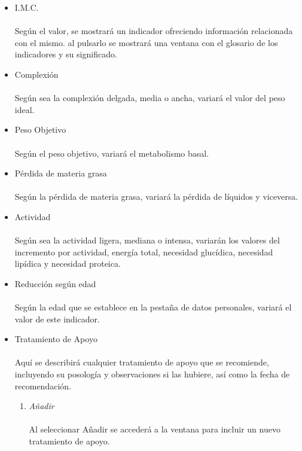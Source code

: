 \documentclass[12pt, spanish]{article}
\begin{document}
\begin{itemize}
\item I.M.C.\\\\
Según el valor, se mostrará un indicador ofreciendo información relacionada con el mismo. al pulsarlo se mostrará una ventana con el glosario de los indicadores y su significado.\\
\item Complexión\\\\
Según sea la complexión delgada, media o ancha, variará el valor del peso ideal.\\
\item Peso Objetivo\\\\
Según el peso objetivo, variará el metabolismo basal.\\
\item Pérdida de materia grasa\\\\
Según la pérdida de materia grasa, variará la pérdida de líquidos y viceversa.\\
\item Actividad\\\\
Según sea la actividad ligera, mediana o intensa, variarán los valores del incremento por actividad, energía total, necesidad glucídica, necesidad lipídica y necesidad proteica.\\
\item Reducción según edad\\\\
Según la edad que se establece en la pestaña de datos personales, variará el valor de este indicador.\\
\item Tratamiento de Apoyo\\\\
Aquí se describirá cualquier tratamiento de apoyo que se recomiende, incluyendo su posología y observaciones si las hubiere, así como la fecha de recomendación.\\
\begin{enumerate}
\item \textit{Añadir}\\\\
Al seleccionar Añadir se accederá a la ventana para incluir un nuevo tratamiento de apoyo.\\\\

\end{enumerate}
\end{itemize}
\end{document}
